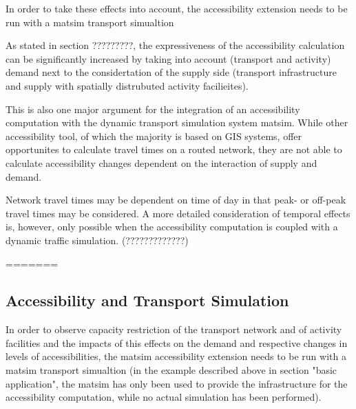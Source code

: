 In order to take these effects into account, the  accessibility extension 
needs to be run with a \gls{matsim} transport simualtion


As stated in section ?????????, the expressiveness of the accessibility calculation can be significantly increased 
by taking into account (transport and activity) demand next to the considertation of the supply side (transport 
infrastructure and supply with spatially distrubuted activity facilieites). 

This is also one major argument for the 
integration of an accessibility computation with the dynamic transport simulation system \gls{matsim}. While other 
accessibility tool, of which the majority is based on GIS systems, offer opportunites to calculate travel times on 
a routed network, they are not able to calculate accessibility changes dependent on the interaction of supply and 
demand. 

Network travel times may be dependent on time of day in that \eg peak- or off-peak travel times may be 
considered. A more detailed consideration of temporal effects is, however, only possible when the accessibility 
computation is coupled with a dynamic traffic simulation. (?????????????)


=======
\subsection{Accessibility and Transport Simulation}
In order to observe capacity restriction of the transport network and of activity facilities and the impacts of 
this effects on the demand and respective changes in levels of accessibilities, the \gls{matsim} accessibility 
extension needs to be run with a \gls{matsim} transport simualtion (in the example described above in section "basic 
application", the \gls{matsim} has only been used to provide the infrastructure for the accessibility computation, 
while no actual simulation has been performed).

